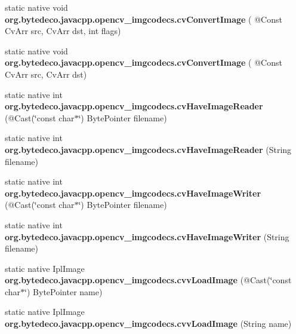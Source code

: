 \begin{DoxyCompactItemize}
\mbox{\label{group__imgcodecs__c_gaaf4f9a1086cdfc48476dda439c09040f}} 
static native void {\bfseries org.\+bytedeco.\+javacpp.\+opencv\+\_\+imgcodecs.\+cv\+Convert\+Image} ( @Const Cv\+Arr src, Cv\+Arr dst, int flags)
\item 
\mbox{\label{group__imgcodecs__c_gad15f57174de8503b5e88b2ea68e13541}} 
static native void {\bfseries org.\+bytedeco.\+javacpp.\+opencv\+\_\+imgcodecs.\+cv\+Convert\+Image} ( @Const Cv\+Arr src, Cv\+Arr dst)
\item 
\mbox{\label{group__imgcodecs__c_ga1cac2e0f6b8e646be81129022aa3558c}} 
static native int {\bfseries org.\+bytedeco.\+javacpp.\+opencv\+\_\+imgcodecs.\+cv\+Have\+Image\+Reader} (@Cast(\char`\"{}const char$\ast$\char`\"{}) Byte\+Pointer filename)
\item 
\mbox{\label{group__imgcodecs__c_ga363036439f049251a3bd4b1eb06a7751}} 
static native int {\bfseries org.\+bytedeco.\+javacpp.\+opencv\+\_\+imgcodecs.\+cv\+Have\+Image\+Reader} (String filename)
\item 
\mbox{\label{group__imgcodecs__c_ga45efefb2f15a9c3ee3a565d862a7d43e}} 
static native int {\bfseries org.\+bytedeco.\+javacpp.\+opencv\+\_\+imgcodecs.\+cv\+Have\+Image\+Writer} (@Cast(\char`\"{}const char$\ast$\char`\"{}) Byte\+Pointer filename)
\item 
\mbox{\label{group__imgcodecs__c_gac54449ef585ed0985003ac6bffaca87c}} 
static native int {\bfseries org.\+bytedeco.\+javacpp.\+opencv\+\_\+imgcodecs.\+cv\+Have\+Image\+Writer} (String filename)
\item 
\mbox{\label{group__imgcodecs__c_ga2fd2e7a3afddaffbe54209779b666809}} 
static native Ipl\+Image {\bfseries org.\+bytedeco.\+javacpp.\+opencv\+\_\+imgcodecs.\+cvv\+Load\+Image} (@Cast(\char`\"{}const char$\ast$\char`\"{}) Byte\+Pointer name)
\item 
\mbox{\label{group__imgcodecs__c_gacc2c9a547c0196e1027d2d344f8f598f}} 
static native Ipl\+Image {\bfseries org.\+bytedeco.\+javacpp.\+opencv\+\_\+imgcodecs.\+cvv\+Load\+Image} (String name)

\end{DoxyCompactItemize}
